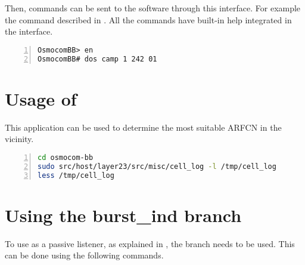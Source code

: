 Then, commands can be sent to the software through this interface. For
example the  command described in
. All the commands have built-in help integrated
in the interface.

      \begin{lstlisting}[numbers=left,
basicstyle=\footnotesize, breaklines=true, frame=single]
OsmocomBB> en
OsmocomBB# dos camp 1 242 01
      \end{lstlisting}

\iffalse
\subsection{Sending a silent SMS message}

This is an example of the modified \prog{mobile} application usage to
send a silent SMS message. These commands need to be written in the
\prog{telnet} prompt. If the \prog{mobile} application was started with
the \code{-i 127.0.0.1} argument, all the layer 3 messages are readable
in \proj{Wireshark} if it is listening on the \code{localhost}.

      \begin{lstlisting}[numbers=left,
basicstyle=\footnotesize, breaklines=true, frame=single]
OsmocomBB> en
OsmocomBB# silent 1 1
OsmocomBB# sms 1 +47123456 Example of silent SMS message
      \end{lstlisting}
\fi

\section{Usage of }

This application can be used to determine the most suitable ARFCN in the
vicinity.

      \begin{lstlisting}[language=bash, numbers=left,
basicstyle=\footnotesize, breaklines=true, frame=single]
cd osmocom-bb
sudo src/host/layer23/src/misc/cell_log -l /tmp/cell_log
less /tmp/cell_log
      \end{lstlisting}

\section{Using the burst\_ind branch}

To use  as a passive listener, as explained in
, the  branch needs to be
used. This can be done using the following commands.


